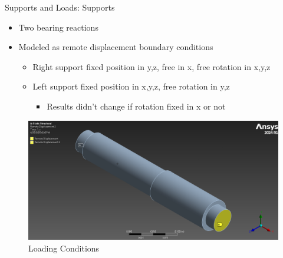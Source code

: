 \documentclass[11pt]{beamer}
\begin{document}
    \begin{frame}{Supports and Loads: Supports}
        \begin{itemize}
            \item Two bearing reactions
            \item Modeled as remote displacement boundary conditions
                \begin{itemize}
                    \item Right support fixed position in y,z, free in x, free rotation in x,y,z
                    \item Left support fixed position in x,y,z, free rotation in y,z
                        \begin{itemize} 
                            \item Results didn't change if rotation fixed in x or not
                        \end{itemize}
                \end{itemize}
        \end{itemize}
        \begin{figure}
            \centering
            \includegraphics[scale=0.22]{figs/BC_all_iso.png}
            \caption{Loading Conditions}
        \end{figure}
    \end{frame}
\end{document}
